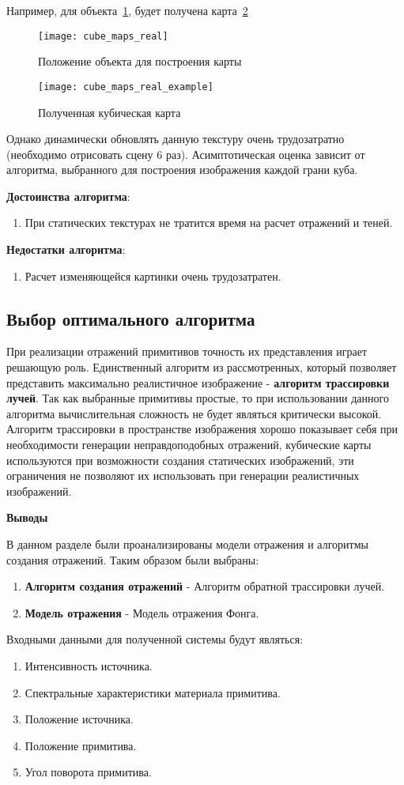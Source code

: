 Например, для объекта~\ref{fig:cube_maps_real}, будет получена карта~\ref{fig:cube_maps_real_example}


\begin{figure}[H]
	\centering
	\texttt{[image: cube\_maps\_real]}
	\caption{Положение объекта для построения карты}
	\label{fig:cube_maps_real}
\end{figure}


\begin{figure}[H]
	\centering
	\texttt{[image: cube\_maps\_real\_example]}
	\caption{Полученная кубическая карта}
	\label{fig:cube_maps_real_example}
\end{figure}


Однако динамически обновлять данную текстуру очень трудозатратно (необходимо отрисовать сцену 6 раз). Асимптотическая оценка зависит от алгоритма, выбранного для построения изображения каждой грани куба.


\textbf{Достоинства алгоритма}:
\begin{enumerate}
	\item При статических текстурах не тратится время на расчет отражений и теней. \cite{reflexion_types}
\end{enumerate}

\textbf{Недостатки алгоритма}:
\begin{enumerate}
	\item Расчет изменяющейся картинки очень трудозатратен. \cite{reflexion_types}
\end{enumerate}

\subsection{Выбор оптимального алгоритма}
При реализации отражений примитивов точность их представления играет решающую роль. Единственный алгоритм из рассмотренных, который позволяет представить максимально
реалистичное изображение - \textbf{алгоритм трассировки лучей}. Так как выбранные примитивы простые, то при использовании данного алгоритма вычислительная
сложность не будет являться критически высокой. Алгоритм  трассировки в пространстве изображения хорошо показывает себя при необходимости генерации неправдоподобных отражений, кубические карты
используются при возможности создания статических изображений, эти ограничения не позволяют их использовать при генерации реалистичных изображений.


\textbf{Выводы}

В данном разделе были проанализированы модели отражения и алгоритмы создания отражений.
Таким образом были выбраны:
\begin{enumerate}
	\item \textbf{Алгоритм создания отражений} - Алгоритм обратной трассировки лучей.
	\item \textbf{Модель отражения} - Модель отражения Фонга.
\end{enumerate}


Входными данными для полученной системы будут являться:
\begin{enumerate}
	\item Интенсивность источника.
	\item Спектральные характеристики материала примитива.
	\item Положение источника.
	\item Положение примитива.
	\item Угол поворота примитива.
\end{enumerate}